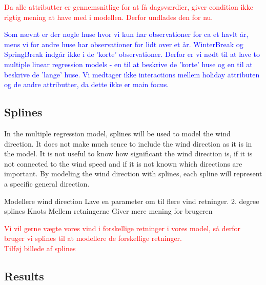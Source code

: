 \noindent \textcolor{red}{Da alle attributter er gennemsnitlige for at få dagsværdier, giver condition ikke rigtig mening at have med i modellen. Derfor undlades den for nu.}

\noindent \textcolor{blue}{Som nævnt er der nogle huse hvor vi kun har observationer for ca et havlt år, mens vi for andre huse har observationer for lidt over et år. WinterBreak og SpringBreak indgår ikke i de 'korte' observationer. Derfor er vi nødt til at lave to multiple linear regression models - en til at beskrive de 'korte' huse og en til at beskrive de 'lange' huse. Vi medtager ikke interactions mellem holiday attributen og de andre attributter, da dette ikke er main focus. }

\subsection{Splines}
In the multiple regression model, splines will be used to model the wind direction. It does not make much sence to include the wind direction as it is in the model. It is not useful to know how significant the wind direction is, if it is not connected to the wind speed and if it is not known which directions are important. By modeling the wind direction with splines, each spline will represent a specific general direction.

Modellere wind direction
Lave en parameter om til flere vind retninger.
2. degree splines
Knots
Mellem retningerne
Giver mere mening for brugeren

\textcolor{red}{Vi vil gerne vægte vores vind i forskellige retninger i vores model, så derfor bruger vi splines til at modellere de forskellige retninger.} \\

\textcolor{red}{Tilføj billede af splines}

\subsection{Results}

